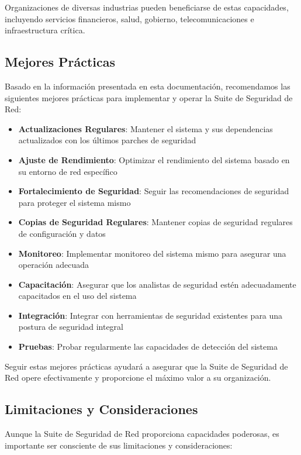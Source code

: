 Organizaciones de diversas industrias pueden beneficiarse de estas capacidades, incluyendo servicios financieros, salud, gobierno, telecomunicaciones e infraestructura crítica.

\subsection{Mejores Prácticas}
Basado en la información presentada en esta documentación, recomendamos las siguientes mejores prácticas para implementar y operar la Suite de Seguridad de Red:

\begin{itemize}
    \item \textbf{Actualizaciones Regulares}: Mantener el sistema y sus dependencias actualizados con los últimos parches de seguridad
    \item \textbf{Ajuste de Rendimiento}: Optimizar el rendimiento del sistema basado en su entorno de red específico
    \item \textbf{Fortalecimiento de Seguridad}: Seguir las recomendaciones de seguridad para proteger el sistema mismo
    \item \textbf{Copias de Seguridad Regulares}: Mantener copias de seguridad regulares de configuración y datos
    \item \textbf{Monitoreo}: Implementar monitoreo del sistema mismo para asegurar una operación adecuada
    \item \textbf{Capacitación}: Asegurar que los analistas de seguridad estén adecuadamente capacitados en el uso del sistema
    \item \textbf{Integración}: Integrar con herramientas de seguridad existentes para una postura de seguridad integral
    \item \textbf{Pruebas}: Probar regularmente las capacidades de detección del sistema
\end{itemize}

Seguir estas mejores prácticas ayudará a asegurar que la Suite de Seguridad de Red opere efectivamente y proporcione el máximo valor a su organización.

\subsection{Limitaciones y Consideraciones}
Aunque la Suite de Seguridad de Red proporciona capacidades poderosas, es importante ser consciente de sus limitaciones y consideraciones:

